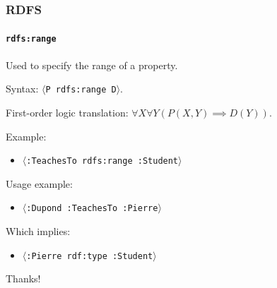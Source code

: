 \documentclass{beamer}
\newcommand{\triplet}[1]{$\langle$\texttt{#1}$\rangle$}
\begin{document}
\begin{frame}
  \frametitle{RDFS}
  \framesubtitle{\texttt{rdfs:range}}

  Used to specify the range of a property.

  \pause

  \bigskip

  Syntax: \triplet{P rdfs:range D}.

  \pause

  \medskip

  First-order logic translation: $\forall X \forall Y (P(X, Y) \implies D(Y))$.

  \pause

  \bigskip

  Example:

  \begin{itemize}
    \item \triplet{:TeachesTo rdfs:range :Student}
  \end{itemize}

  \pause

  Usage example:

  \begin{itemize}
    \item \triplet{:Dupond :TeachesTo :Pierre}
  \end{itemize}

  \pause

  Which implies:

  \begin{itemize}
    \item \triplet{:Pierre rdf:type :Student}
  \end{itemize}
\end{frame}

\begin{frame}

\end{frame}

\begin{frame}

\end{frame}

\begin{frame}

\end{frame}

\begin{frame}

\end{frame}

\begin{frame}

\end{frame}

\begin{frame}

\end{frame}

\begin{frame}

\end{frame}

\begin{frame}

\end{frame}

\begin{frame}
  \begin{center}
    \Huge{Thanks!}
  \end{center}
\end{frame}
\end{document}
